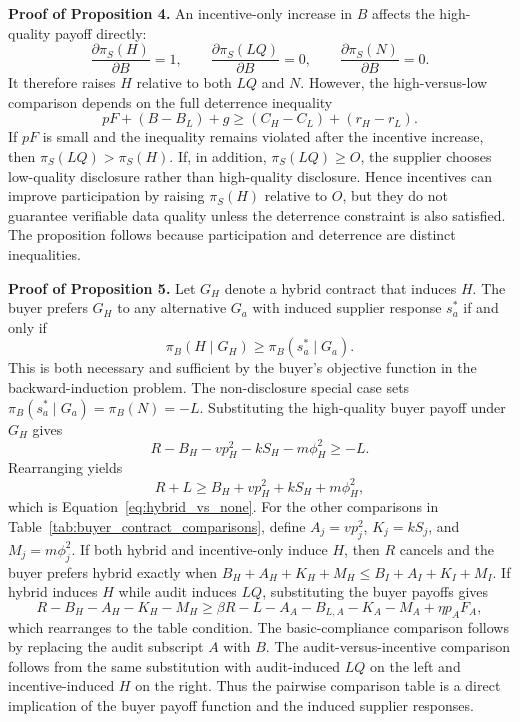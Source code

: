 \documentclass[final,5p,times,authoryear]{elsarticle}
\begin{document}
\textbf{Proof of Proposition 4.} An incentive-only increase in $B$ affects the high-quality payoff directly:
\[
\frac{\partial \pi_S(H)}{\partial B}=1,\qquad
\frac{\partial \pi_S(LQ)}{\partial B}=0,\qquad
\frac{\partial \pi_S(N)}{\partial B}=0.
\]
It therefore raises $H$ relative to both $LQ$ and $N$. However, the high-versus-low comparison depends on the full deterrence inequality
\[
pF+(B-B_L)+g \geq (C_H-C_L)+(r_H-r_L).
\]
If $pF$ is small and the inequality remains violated after the incentive increase, then $\pi_S(LQ)>\pi_S(H)$. If, in addition, $\pi_S(LQ)\geq O$, the supplier chooses low-quality disclosure rather than high-quality disclosure. Hence incentives can improve participation by raising $\pi_S(H)$ relative to $O$, but they do not guarantee verifiable data quality unless the deterrence constraint is also satisfied. The proposition follows because participation and deterrence are distinct inequalities.

\textbf{Proof of Proposition 5.} Let $G_H$ denote a hybrid contract that induces $H$. The buyer prefers $G_H$ to any alternative $G_a$ with induced supplier response $s_a^*$ if and only if
\[
\pi_B(H\mid G_H)\geq \pi_B(s_a^*\mid G_a).
\]
This is both necessary and sufficient by the buyer's objective function in the backward-induction problem. The non-disclosure special case sets $\pi_B(s_a^*\mid G_a)=\pi_B(N)=-L$. Substituting the high-quality buyer payoff under $G_H$ gives
\[
R-B_H-vp_H^2-kS_H-m\phi_H^2\geq -L.
\]
Rearranging yields
\[
R+L\geq B_H+vp_H^2+kS_H+m\phi_H^2,
\]
which is Equation~\ref{eq:hybrid_vs_none}. For the other comparisons in Table~\ref{tab:buyer_contract_comparisons}, define $A_j=vp_j^2$, $K_j=kS_j$, and $M_j=m\phi_j^2$. If both hybrid and incentive-only induce $H$, then $R$ cancels and the buyer prefers hybrid exactly when $B_H+A_H+K_H+M_H\leq B_I+A_I+K_I+M_I$. If hybrid induces $H$ while audit induces $LQ$, substituting the buyer payoffs gives
\[
R-B_H-A_H-K_H-M_H
\geq
\beta R-L-A_A-B_{L,A}-K_A-M_A+\eta p_AF_A,
\]
which rearranges to the table condition. The basic-compliance comparison follows by replacing the audit subscript $A$ with $B$. The audit-versus-incentive comparison follows from the same substitution with audit-induced $LQ$ on the left and incentive-induced $H$ on the right. Thus the pairwise comparison table is a direct implication of the buyer payoff function and the induced supplier responses.
\end{document}
